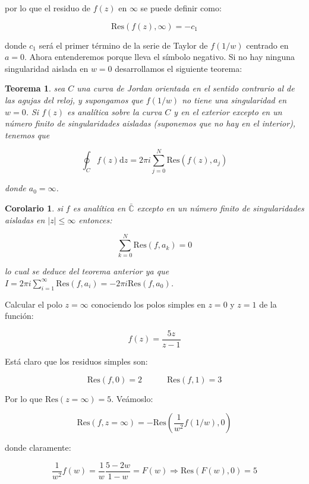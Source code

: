 \documentclass[12pt]{book}
\newcommand{\D}{\mathrm{d}}
\newcommand{\Res}{\mathrm{Res}}
\newtheorem{theorem}{Teorema}[section]
\newtheorem{corollary}{Corolario}[theorem]
\begin{document}
por lo que el residuo de $f(z)$ en $\infty$ se puede definir como:

\begin{equation}
\Res  (f(z), \infty) = - c_1
\end{equation}

donde $c_1$ será el primer término de la serie de Taylor de $f(1/w)$ centrado en $a=0$. Ahora entenderemos porque lleva el símbolo negativo. Si no hay ninguna singularidad aislada en $w=0$ desarrollamos el siguiente teorema:

\begin{theorem}
sea $C$ una curva de Jordan orientada en el sentido contrario al de las agujas del reloj, y supongamos que $f(1/w)$ no tiene una singularidad en $w=0$. Si $f(z)$ es analítica sobre la curva $C$ y en el exterior excepto en un número finito de singularidades aisladas (suponemos que no hay en el interior), tenemos que

$$ \oint_C f(z) \D z = 2 \pi i \sum_{j=0}^N \Res (f(z),a_j) $$

donde $a_0 = \infty$.
\end{theorem}

\begin{corollary}
si  $f$ es analítica en $\bar{\mathbb{C}}$ excepto en un número finito de singularidades aisladas en $|z| \leq  \infty$ entonces:

$$ \sum_{k=0}^N \Res  (f,a_k) = 0 $$

lo cual se deduce del teorema anterior ya que $I=2 \pi i\sum_{i=1}^{\infty} \Res (f,a_i) = - 2 \pi i \Res(f,a_0)$. 

\end{corollary}





\hrulefill


Calcular el polo $z=\infty$ conociendo los polos simples en $z=0$ y $z=1$ de la función:

$$ f(z) = \frac{5 z}{z-1} $$

Está claro que los residuos simples son:

$$ \Res(f,0) = 2 \quad \quad \quad \Res(f,1) = 3 $$

Por lo que $\Res(z=\infty)  = 5$. Veámoslo:

$$ \Res (f,z=\infty) = - \Res(\dfrac{1}{w^2} f(1/w),0) $$


donde claramente:

$$ \dfrac{1}{w^2} f(w) =  \dfrac{1}{w} \dfrac{5-2w}{1-w} =F(w) \Longrightarrow  \Res(F(w),0) = 5 $$
\end{document}

